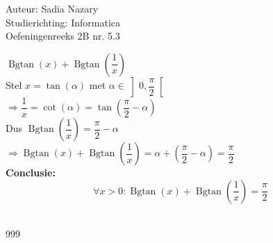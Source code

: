 \documentclass[a4paper]{article}
\begin{document}
  
\noindent \large Auteur: Sadia Nazary        \\
\noindent \large Studierichting: Informatica \\
\noindent \large Oefeningenreeks 2B nr. 5.3 \\

\medskip

\normalsize

$ \operatorname{Bgtan}(x) + \operatorname{Bgtan}\left( \dfrac{1}{x} \right) $ \\

Stel $ x = \tan(\alpha) $ met $ \alpha \in \left]0, \dfrac{\pi}{2}\right[ $ \\

$\Rightarrow \dfrac{1}{x} = \cot(\alpha) = \tan\left( \dfrac{\pi}{2} - \alpha \right) $ \\

Dus $ \operatorname{Bgtan}\left( \dfrac{1}{x} \right) = \dfrac{\pi}{2} - \alpha $ \\

$ \Rightarrow \operatorname{Bgtan}(x) + \operatorname{Bgtan}\left( \dfrac{1}{x} \right) = \alpha + \left( \dfrac{\pi}{2} - \alpha \right) = \dfrac{\pi}{2} $ \\

\textbf{Conclusie:} \\

$$ \forall x > 0 : \operatorname{Bgtan}(x) + \operatorname{Bgtan}\left( \dfrac{1}{x} \right) = \dfrac{\pi}{2} $$\\

\begin{thebibliography}{999}
\end{thebibliography}
\end{document}

